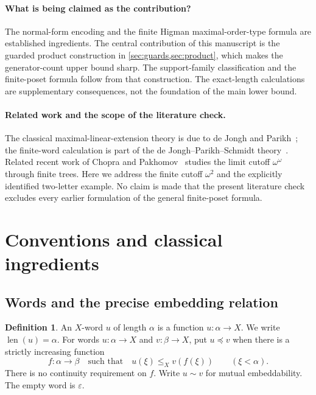 \documentclass[11pt]{article}
\numberwithin{equation}{section}
\theoremstyle{plain}
\theoremstyle{definition}
\newtheorem{definition}[definition]{Definition}
\theoremstyle{remark}
\newcommand{\emp}{\varepsilon}
\newcommand{\len}{\operatorname{len}}
\newcommand{\sub}{\preccurlyeq}
\newcommand{\equ}{\sim}
\begin{document}
\paragraph{What is being claimed as the contribution?}
The normal-form encoding and the finite Higman maximal-order-type formula are established ingredients. The central contribution of this manuscript is the guarded product construction in \cref{sec:guards,sec:product}, which makes the generator-count upper bound sharp. The support-family classification and the finite-poset formula follow from that construction. The exact-length calculations are supplementary consequences, not the foundation of the main lower bound.

\paragraph{Related work and the scope of the literature check.}
The classical maximal-linear-extension theory is due to de Jongh and Parikh~\cite{DJP}; the finite-word calculation is part of the de Jongh--Parikh--Schmidt theory~\cite{DJP,Schmidt}. Related recent work of Chopra and Pakhomov~\cite{CP} studies the limit cutoff $\omega^\omega$ through finite trees. Here we address the finite cutoff $\omega^2$ and the explicitly identified two-letter example. No claim is made that the present literature check excludes every earlier formulation of the general finite-poset formula.

\section{Conventions and classical ingredients}\label{sec:prelim}

\subsection{Words and the precise embedding relation}

\begin{definition}
An $X$-word $u$ of length $\alpha$ is a function $u:\alpha\to X$. We write $\len(u)=\alpha$. For words $u:\alpha\to X$ and $v:\beta\to X$, put $u\sub v$ when there is a strictly increasing function
\[
 f:\alpha\longrightarrow\beta
 \quad\text{such that}\quad
 u(\xi)\leq_X v(f(\xi))\qquad(\xi<\alpha).
\]
There is no continuity requirement on $f$. Write $u\equ v$ for mutual embeddability. The empty word is $\emp$.
\end{definition}
\end{document}
